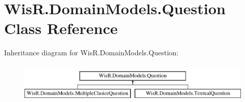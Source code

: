 \hypertarget{class_wis_r_1_1_domain_models_1_1_question}{}\section{Wis\+R.\+Domain\+Models.\+Question Class Reference}
\label{class_wis_r_1_1_domain_models_1_1_question}
Inheritance diagram for Wis\+R.\+Domain\+Models.\+Question\+:\begin{figure}[H]
\begin{center}
\leavevmode
\includegraphics[height=2.000000cm]{class_wis_r_1_1_domain_models_1_1_question}
\end{center}
\end{figure}
